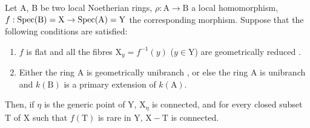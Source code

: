 \begin{theorem}[18.9.7]
\label{IV.18.9.7}
Let $\mathrm{A}$, $\mathrm{B}$ be two local Noetherian rings, $\rho:\mathrm{A}\to\mathrm{B}$ a local homomorphism, $f:\operatorname{Spec}(\mathrm{B})=\mathrm{X}\to\operatorname{Spec}(\mathrm{A})=\mathrm{Y}$ the corresponding morphism.
Suppose that the following conditions are satisfied:
\begin{enumerate}[label=\emph{\roman*)}]
  \item $f$ is flat and all the fibres $\mathrm{X}_y=f^{-1}(y)$ ($y\in\mathrm{Y}$) are geometrically reduced .
  \item Either the ring $\mathrm{A}$ is geometrically unibranch , or else the ring A is unibranch  and $k(\mathrm{B})$ is a primary extension  of $k(\mathrm{A})$.
\end{enumerate}
Then, if $\eta$ is the generic point of $\mathrm{Y}$, $\mathrm{X}_\eta$ is connected, and for every closed subset $\mathrm{T}$ of X such that $f(\mathrm{T})$ is rare in Y, $\mathrm{X}-\mathrm{T}$ is connected.
\end{theorem}

